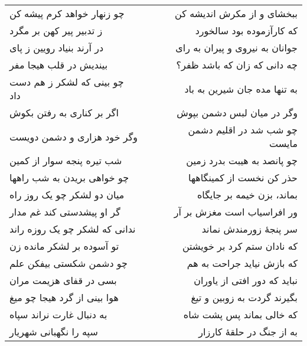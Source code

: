 \begin{center}
\begin{longtable}{l p{0.5cm} r}
\\
چو زنهار خواهد کرم پیشه کن
&&
ببخشای و از مکرش اندیشه کن
\\
ز تدبیر پیر کهن بر مگرد
&&
که کارآزموده بود سالخورد
\\
در آرند بنیاد رویین ز پای
&&
جوانان به نیروی و پیران به رای
\\
بیندیش در قلب هیجا مفر
&&
چه دانی که زان که باشد ظفر؟
\\
چو بینی که لشکر ز هم دست داد
&&
به تنها مده جان شیرین به باد
\\
اگر بر کناری به رفتن بکوش
&&
وگر در میان لبس دشمن بپوش
\\
وگر خود هزاری و دشمن دویست
&&
چو شب شد در اقلیم دشمن مایست
\\
شب تیره پنجه سوار از کمین
&&
چو پانصد به هیبت بدرد زمین
\\
چو خواهی بریدن به شب راهها
&&
حذر کن نخست از کمینگاهها
\\
میان دو لشکر چو یک روز راه
&&
بماند، بزن خیمه بر جایگاه
\\
گر او پیشدستی کند غم مدار
&&
ور افراسیاب است مغزش بر آر
\\
ندانی که لشکر چو یک روزه راند
&&
سر پنجهٔ زورمندش نماند
\\
تو آسوده بر لشکر مانده زن
&&
که نادان ستم کرد بر خویشتن
\\
چو دشمن شکستی بیفکن علم
&&
که بازش نیاید جراحت به هم
\\
بسی در قفای هزیمت مران
&&
نباید که دور افتی از یاوران
\\
هوا بینی از گرد هیجا چو میغ
&&
بگیرند گردت به زوبین و تیغ
\\
به دنبال غارت نراند سپاه
&&
که خالی بماند پس پشت شاه
\\
سپه را نگهبانی شهریار
&&
به از جنگ در حلقهٔ کارزار
\\
\end{longtable}
\end{center}
